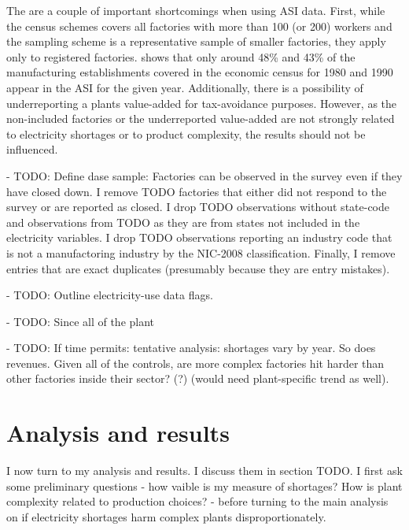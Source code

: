 \documentclass[11pt]{article}
\begin{document}
The are a couple of important shortcomings when using ASI data. First, while the census schemes covers all factories with more than 100 (or 200) workers and the sampling scheme is a representative sample of smaller factories, they apply only to registered factories. \cite{nagaraj_how_2002} shows that only around 48\% and 43\% of the manufacturing establishments covered in the economic census for 1980 and 1990 appear in the ASI for the given year. Additionally, there is a possibility of underreporting a plants value-added for tax-avoidance purposes. However, as the non-included factories or the underreported value-added are not strongly related to electricity shortages or to product complexity, the results should not be influenced. 

- TODO: Define dase sample: Factories can be observed in the survey even if they have closed down. I remove TODO factories that either did not respond to the survey or are reported as closed. I drop TODO observations without state-code and observations from TODO as they are from states not included in the electricity variables. I drop TODO observations reporting an industry code that is not a manufactoring industry by the NIC-2008 classification. Finally, I remove entries that are exact duplicates (presumably because they are entry mistakes). 

- TODO: Outline electricity-use data flags.

- TODO: Since all of the plant

- TODO: If time permits: tentative analysis: shortages vary by year. So does revenues. Given all of the controls, are more complex factories hit harder than other factories inside their sector? (?) (would need plant-specific trend as well).


\newpage

\section{Analysis and results}%
\label{sec:analysis_and_results}

I now turn to my analysis and results. I discuss them in section TODO. I first ask some preliminary questions - how vaible is my measure of shortages? How is plant complexity related to production choices? - before turning to the main analysis on if electricity shortages harm complex plants disproportionately. 
\end{document}
